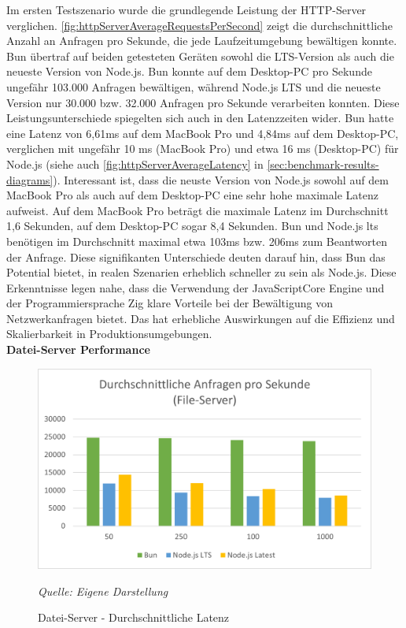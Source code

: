 \noindent
Im ersten Testszenario wurde die grundlegende Leistung der HTTP-Server verglichen. \autoref{fig:httpServerAverageRequestsPerSecond} zeigt die durchschnittliche Anzahl an Anfragen pro Sekunde, die jede Laufzeitumgebung bewältigen konnte. Bun übertraf auf beiden getesteten Geräten sowohl die LTS-Version als auch die neueste Version von Node.js. Bun konnte auf dem Desktop-PC pro Sekunde ungefähr 103.000 Anfragen bewältigen, während Node.js LTS und die neueste Version nur 30.000 bzw. 32.000 Anfragen pro Sekunde verarbeiten konnten. Diese Leistungsunterschiede spiegelten sich auch in den Latenzzeiten wider. Bun hatte eine Latenz von 6,61ms auf dem MacBook Pro und 4,84ms auf dem Desktop-PC, verglichen mit ungefähr 10 ms (MacBook Pro) und etwa 16 ms (Desktop-PC) für Node.js (siehe auch \autoref{fig:httpServerAverageLatency} in \autoref{sec:benchmark-results-diagrams}). Interessant ist, dass die neuste Version von Node.js sowohl auf dem MacBook Pro als auch auf dem Desktop-PC eine sehr hohe maximale Latenz aufweist. Auf dem MacBook Pro beträgt die maximale Latenz im Durchschnitt 1,6 Sekunden, auf dem Desktop-PC sogar 8,4 Sekunden. Bun und Node.js \ac{lts} benötigen im Durchschnitt maximal etwa 103ms bzw. 206ms zum Beantworten der Anfrage.\newline
Diese signifikanten Unterschiede deuten darauf hin, dass Bun das Potential bietet, in realen Szenarien erheblich schneller zu sein als Node.js. Diese Erkenntnisse legen nahe, dass die Verwendung der JavaScriptCore Engine und der Programmiersprache Zig klare Vorteile bei der Bewältigung von Netzwerkanfragen bietet. Das hat erhebliche Auswirkungen auf die Effizienz und Skalierbarkeit in Produktionsumgebungen.\\

\noindent
\textbf{Datei-Server Performance}
\begin{figure}[h!]
	\centering
	\includegraphics[width=\linewidth]{./images/fileServerAverageLatencyDesktop.png}
	\caption{Datei-Server - Durchschnittliche Latenz}
	\label{fig:fileServerAverageLatency}
	\textit{Quelle: Eigene Darstellung}
\end{figure}

